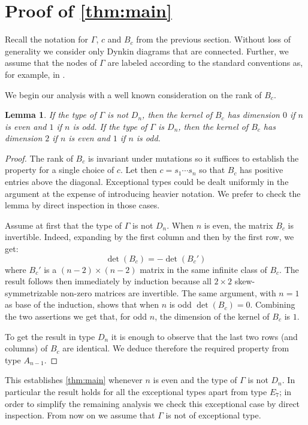 \documentclass[11pt]{amsart}
\newtheorem{lemma}[theorem]{Lemma}
\theoremstyle{definition}
\numberwithin{equation}{section}
\numberwithin{figure}{section}
\begin{document}
\section{Proof of \cref{thm:main}}
\label{proof}
  Recall the notation for $\Gamma$, $c$ and $B_c$ from the previous section. 
  Without loss of generality we consider only Dynkin diagrams that are connected.
  Further, we assume that the nodes of $\Gamma$ are labeled according to the standard conventions as, for example, in \cite[Table Fin.]{Kac90}.

  We begin our analysis with a well known consideration on the rank of $B_c$.
  \begin{lemma}
    \label{lem:dimensions}
    If the type of $\Gamma$ is not $D_n$, then the kernel of $B_c$ has dimension $0$ if $n$ is even and $1$ if $n$ is odd.
    If the type of $\Gamma$ is $D_n$, then the kernel of $B_c$ has dimension $2$ if $n$ is even and $1$ if $n$ is odd.
  \end{lemma}
  \begin{proof}
    The rank of $B_c$ is invariant under mutations so it suffices to establish the property for a single choice of $c$. 
    Let then $c=s_1\cdots s_n$ so that $B_c$ has positive entries above the diagonal.
    Exceptional types could be dealt uniformly in the argument at the expense of introducing heavier notation. 
    We prefer to check the lemma by direct inspection in those cases.

    Assume at first that the type of $\Gamma$ is not $D_n$.
    When $n$ is even, the matrix $B_c$ is invertible. 
    Indeed, expanding by the first column and then by the first row, we get:
    \[
      \det(B_c)=-\det(B_c')
    \]
    where $B_c'$ is a $(n-2)\times(n-2)$ matrix in the same infinite class of $B_c$. 
    The result follows then immediately by induction because all $2\times2$ skew-symmetrizable non-zero matrices are invertible.
    The same argument, with $n=1$ as base of the induction, shows that when $n$ is odd $\det(B_c)=0$.
    Combining the two assertions we get that, for odd $n$, the dimension of the kernel of $B_c$ is $1$.

    To get the result in type $D_n$ it is enough to observe that the last two rows (and columns) of $B_c$ are identical. 
    We deduce therefore the required property from type $A_{n-1}$.
  \end{proof}

  This establishes \cref{thm:main} whenever $n$ is even and the type of $\Gamma$ is not $D_n$.
  In particular the result holds for all the exceptional types apart from type $E_7$; in order to simplify the remaining analysis we check this exceptional case by direct inspection.
  From now on we assume that $\Gamma$ is not of exceptional type.
\end{document}
